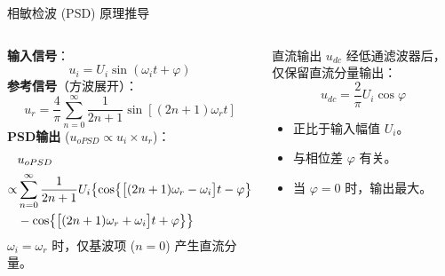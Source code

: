 \documentclass[10pt]{beamer}
\begin{document}
\begin{frame}{相敏检波 (PSD) 原理推导}
    \begin{columns}
        \textbf{输入信号}：
        \begin{equation}
            u_i = U_i \sin(\omega_i t + \varphi)
        \end{equation}
        \textbf{参考信号}（方波展开）：
        \begin{equation}
            u_r = \frac{4}{\pi}\sum_{n=0}^{\infty}\frac{1}{2n+1}\sin[(2n+1)\omega_{r}t]
        \end{equation}
        \textbf{PSD输出} ($u_{oPSD} \propto u_i \times u_r$)：
        \begin{align}
            &
            u_{oPSD}
            \notag \\
            \propto
            &
            \sum_{n=0}^{\infty}\frac{1}{2n+1}
            U_i \bigl\{
                \cos \bigl\{
                    \bigl[ (2n+1)\omega_{r} - \omega_i \bigr] t - \varphi
                \bigr\}
            \notag \\
            &
            -
                \cos \bigl\{
                    \bigl[ (2n+1)\omega_{r} + \omega_i \bigr] t + \varphi
                \bigr\}
            \bigr\}
        \end{align}
        $\omega_i = \omega_r$ 时，仅基波项 ($n=0$) 产生直流分量。
        \begin{block}{直流输出 $u_{dc}$}
            经低通滤波器后，仅保留直流分量输出：
            \begin{equation}
                u_{dc} = \frac{2}{\pi} U_i \cos \varphi
            \end{equation}
            \begin{itemize}
                \item 正比于输入幅值 $U_i$。
                \item 与相位差 $\varphi$ 有关。
                \item 当 $\varphi = 0$ 时，输出最大。
            \end{itemize}
        \end{block}
    \end{columns}
\end{frame}
\end{document}

